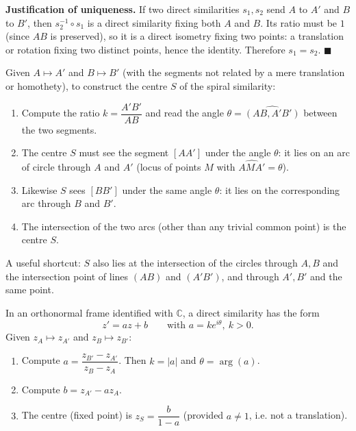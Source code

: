 \documentclass[11pt]{article}
\begin{document}
\textbf{Justification of uniqueness.} If two direct similarities $s_1, s_2$ send $A$ to $A'$ and $B$ to $B'$, then $s_2^{-1} \circ s_1$ is a direct similarity fixing both $A$ and $B$. Its ratio must be $1$ (since $AB$ is preserved), so it is a direct isometry fixing two points: a translation or rotation fixing two distinct points, hence the identity. Therefore $s_1 = s_2$. \hfill$\blacksquare$

\begin{methode}
Given $A \mapsto A'$ and $B \mapsto B'$ (with the segments not related by a mere translation or homothety), to construct the centre $S$ of the spiral similarity:
\begin{enumerate}
\item Compute the ratio $k = \dfrac{A'B'}{AB}$ and read the angle $\theta = \widehat{(AB, A'B')}$ between the two segments.
\item The centre $S$ must see the segment $[AA']$ under the angle $\theta$: it lies on an arc of circle through $A$ and $A'$ (locus of points $M$ with $\widehat{AMA'} = \theta$).
\item Likewise $S$ sees $[BB']$ under the same angle $\theta$: it lies on the corresponding arc through $B$ and $B'$.
\item The intersection of the two arcs (other than any trivial common point) is the centre $S$.
\end{enumerate}
A useful shortcut: $S$ also lies at the intersection of the circles through $A, B$ and the intersection point of lines $(AB)$ and $(A'B')$, and through $A', B'$ and the same point.
\end{methode}

\begin{methode}
In an orthonormal frame identified with $\mathbb{C}$, a direct similarity has the form
\[
z' = a z + b \qquad \text{with } a = k e^{i\theta},\ k>0.
\]
Given $z_A \mapsto z_{A'}$ and $z_B \mapsto z_{B'}$:
\begin{enumerate}
\item Compute $a = \dfrac{z_{B'} - z_{A'}}{z_B - z_A}$. Then $k = |a|$ and $\theta = \arg(a)$.
\item Compute $b = z_{A'} - a z_A$.
\item The centre (fixed point) is $z_S = \dfrac{b}{1-a}$ (provided $a \neq 1$, i.e. not a translation).
\end{enumerate}
\end{methode}
\end{document}
